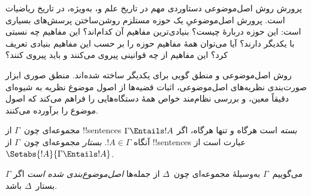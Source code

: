 \documentclass[../../../include/open-logic-section]{subfiles}
\begin{document}

\begin{explain}
پرورش روش اصل‌موضوعی دستاوردی مهم در تاریخ علم و، به‌ویژه، در تاریخ
ریاضیات است. پرورش اصل‌موضوعیِ یک حوزه مستلزم روشن‌ساختن پرسش‌های
بسیاری است: این حوزه دربارهٔ چیست؟ بنیادی‌ترین مفاهیم آن کدام‌اند؟
این مفاهیم چه نسبتی با یکدیگر دارند؟ آیا می‌توان همهٔ مفاهیم حوزه را
بر حسب این مفاهیم بنیادی تعریف کرد؟ این مفاهیم از چه قوانینی پیروی
می‌کنند و باید پیروی کنند؟

روش اصل‌موضوعی و منطق گویی برای یکدیگر ساخته شده‌اند. منطق صوری ابزار
صورت‌بندی نظریه‌های اصل‌موضوعی، اثبات قضیه‌ها از اصول موضوع نظریه به
شیوه‌ای دقیقاً معین، و بررسی نظام‌مند خواص همهٔ دستگاه‌هایی را فراهم
می‌کند که اصول موضوع را برآورده می‌کنند.
\end{explain}

\begin{defn}
مجموعه‌ای چون~$\Gamma$ از !!{sentence}s \emph{بسته} است هرگاه و تنها
هرگاه، اگر $\Gamma \Entails !A$ آنگاه $!A \in \Gamma$. \emph{بستار}
مجموعه‌ای چون~$\Gamma$ از !!{sentence}s عبارت است از
$\Setabs{!A}{\Gamma \Entails !A}$.

می‌گوییم~$\Gamma$ به‌وسیلهٔ مجموعه‌ای چون~$\Delta$ از جمله‌ها
\emph{اصل‌موضوع‌بندی شده است} اگر $\Gamma$ بستار~$\Delta$ باشد.
\end{defn}
\end{document}
